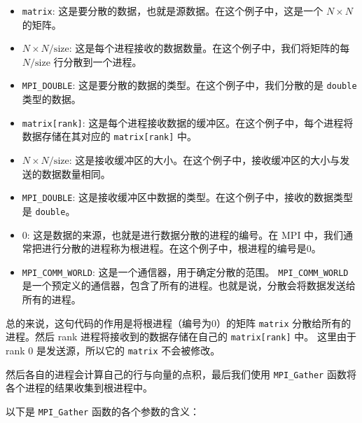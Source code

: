 \documentclass{ctexart}
\begin{document}
\begin{itemize}  
    \item \texttt{matrix}: 这是要分散的数据，也就是源数据。在这个例子中，这是一个 $N \times N$ 的矩阵。  
    \item $N \times N / \text{{size}}$: 这是每个进程接收的数据数量。在这个例子中，我们将矩阵的每 $N / \text{{size}}$ 行分散到一个进程。  
    \item \texttt{MPI\_DOUBLE}: 这是要分散的数据的类型。在这个例子中，我们分散的是 \texttt{double} 类型的数据。  
    \item \texttt{matrix[rank]}: 这是每个进程接收数据的缓冲区。在这个例子中，每个进程将数据存储在其对应的 \texttt{matrix[rank]} 中。  
    \item $N \times N / \text{{size}}$: 这是接收缓冲区的大小。在这个例子中，接收缓冲区的大小与发送的数据数量相同。  
    \item \texttt{MPI\_DOUBLE}: 这是接收缓冲区中数据的类型。在这个例子中，接收的数据类型是 \texttt{double}。  
    \item $0$: 这是数据的来源，也就是进行数据分散的进程的编号。在 MPI 中，我们通常把进行分散的进程称为根进程。在这个例子中，根进程的编号是0。  
    \item \texttt{MPI\_COMM\_WORLD}: 这是一个通信器，用于确定分散的范围。 \texttt{MPI\_COMM\_WORLD} 是一个预定义的通信器，包含了所有的进程。也就是说，分散会将数据发送给所有的进程。  
\end{itemize}  
  
总的来说，这句代码的作用是将根进程（编号为0）的矩阵 \texttt{matrix} 分散给所有的进程。然后 rank 进程将接收到的数据存储在自己的 \texttt{matrix[rank]} 中。
这里由于 rank 0 是发送源，所以它的 \texttt{matrix} 不会被修改。

然后各自的进程会计算自己的行与向量的点积，最后我们使用 \texttt{MPI\_Gather} 函数将各个进程的结果收集到根进程中。

以下是 \texttt{MPI\_Gather} 函数的各个参数的含义：  
  
\end{document}
